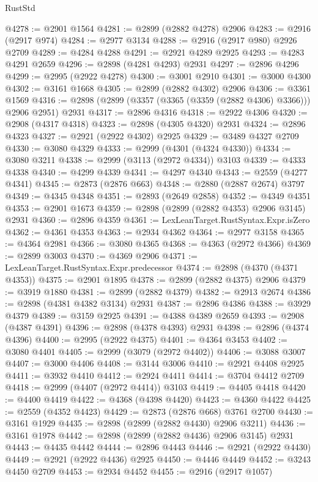 \begin{lexlean}{RustStd}
\begin{coremodule}
@4278 := @2901 @1564
@4281 := @2899 (@2882 @4278) @2906
@4283 := @2916 (@2917 @974)
@4284 := @2977 @3134
@4288 := @2916 (@2917 @980) @2926 @2709
@4289 := @4284 @4288
@4291 := @2921 @4289 @2925
@4293 := @4283 @4291 @2659
@4296 := @2898 (@4281 @4293) @2931
@4297 := @2896 @4296
@4299 := @2995 (@2922 @4278)
@4300 := @3001 @2910
@4301 := @3000 @4300
@4302 := @3161 @1668
@4305 := @2899 (@2882 @4302) @2906
@4306 := @3361 @1569
@4316 := @2898 (@2899 (@3357 (@3365 (@3359 (@2882 @4306) @3366))) @2906 @2951) @2931
@4317 := @2896 @4316
@4318 := @2922 @4306
@4320 := @2908 (@4317 @4318)
@4323 := @2898 (@4305 @4320) @2931
@4324 := @2896 @4323
@4327 := @2921 (@2922 @4302) @2925
@4329 := @3489 @4327 @2709
@4330 := @3080 @4329
@4333 := @2999 (@4301 (@4324 @4330))
@4334 := @3080 @3211
@4338 := @2999 (@3113 (@2972 @4334)) @3103
@4339 := @4333 @4338
@4340 := @4299 @4339
@4341 := @4297 @4340
@4343 := @2559 (@4277 @4341)
@4345 := @2873 (@2876 @663)
@4348 := @2880 (@2887 @2674) @3797
@4349 := @4345 @4348
@4351 := @2893 (@2649 @2858)
@4352 := @4349 @4351
@4353 := @2901 @1673
@4359 := @2898 (@2899 (@2882 @4353) @2906 @3145) @2931
@4360 := @2896 @4359
@4361 := LexLeanTarget.RustSyntax.Expr.isZero
@4362 := @4361 @4353
@4363 := @2934 @4362
@4364 := @2977 @3158
@4365 := @4364 @2981
@4366 := @3080 @4365
@4368 := @4363 (@2972 @4366)
@4369 := @2899 @3003
@4370 := @4369 @2906
@4371 := LexLeanTarget.RustSyntax.Expr.predecessor
@4374 := @2898 (@4370 (@4371 @4353))
@4375 := @2901 @1895
@4378 := @2899 (@2882 @4375) @2906
@4379 := @3919 @1880
@4381 := @2899 (@2882 @4379)
@4382 := @2913 @2674
@4386 := @2898 (@4381 @4382 @3134) @2931
@4387 := @2896 @4386
@4388 := @3929 @4379
@4389 := @3159 @2925
@4391 := @4388 @4389 @2659
@4393 := @2908 (@4387 @4391)
@4396 := @2898 (@4378 @4393) @2931
@4398 := @2896 (@4374 @4396)
@4400 := @2995 (@2922 @4375)
@4401 := @4364 @3453
@4402 := @3080 @4401
@4405 := @2999 (@3079 (@2972 @4402))
@4406 := @3088 @3007
@4407 := @3000 @4406
@4408 := @3144 @3006
@4410 := @2921 @4408 @2925
@4411 := @3932 @4410
@4412 := @2924 @4411
@4414 := @3704 @4412 @2709
@4418 := @2999 (@4407 (@2972 @4414)) @3103
@4419 := @4405 @4418
@4420 := @4400 @4419
@4422 := @4368 (@4398 @4420)
@4423 := @4360 @4422
@4425 := @2559 (@4352 @4423)
@4429 := @2873 (@2876 @668) @3761 @2700
@4430 := @3161 @1929
@4435 := @2898 (@2899 (@2882 @4430) @2906 @3211)
@4436 := @3161 @1978
@4442 := @2898 (@2899 (@2882 @4436) @2906 @3145) @2931
@4443 := @4435 @4442
@4444 := @2896 @4443
@4446 := @2921 (@2922 @4430)
@4449 := @2921 (@2922 @4436) @2925
@4450 := @4446 @4449
@4452 := @3243 @4450 @2709
@4453 := @2934 @4452
@4455 := @2916 (@2917 @1057)

\end{coremodule}
\end{lexlean}
